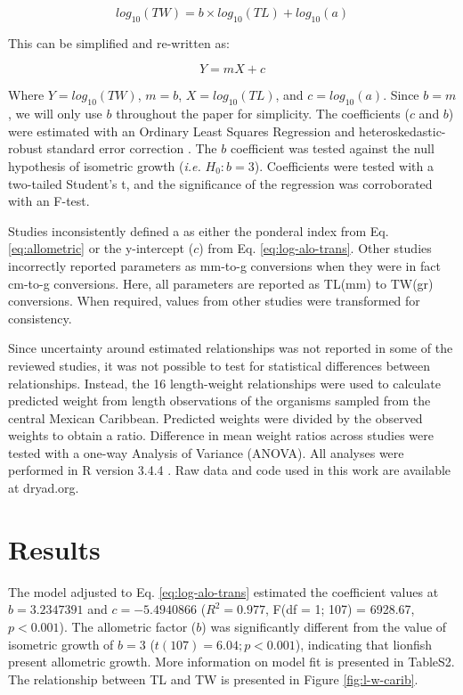 \documentclass[fleqn,10pt,lineno]{wlpeerj} %
\begin{document}
\begin{equation}
\label{eq:log-alo}
log_{10}(TW) = b\times log_{10}(TL) + log_{10}(a)
\end{equation}

This can be simplified and re-written as:

\begin{equation}
\label{eq:log-alo-trans}
Y = mX + c
\end{equation}

Where \(Y = log_{10}(TW)\), \(m = b\), \(X = log_{10}(TL)\), and
\(c = log_{10}(a)\). Since \(b = m\), we will only use \(b\) throughout
the paper for simplicity. The coefficients (\(c\) and \(b\)) were
estimated with an Ordinary Least Squares Regression and
heteroskedastic-robust standard error correction \citep{zeileis_2004}.
The \(b\) coefficient was tested against the null hypothesis of
isometric growth (\emph{i.e.} \(H_0: b = 3\)). Coefficients were tested
with a two-tailed Student's t, and the significance of the regression
was corroborated with an F-test.

Studies inconsistently defined a as either the ponderal index from Eq.
\ref{eq:allometric} or the y-intercept (\(c\)) from Eq.
\ref{eq:log-alo-trans}. Other studies incorrectly reported parameters as
mm-to-g conversions when they were in fact cm-to-g conversions. Here,
all parameters are reported as TL(mm) to TW(gr) conversions. When
required, values from other studies were transformed for consistency.

Since uncertainty around estimated relationships was not reported in
some of the reviewed studies, it was not possible to test for
statistical differences between relationships. Instead, the 16
length-weight relationships were used to calculate predicted weight from
length observations of the organisms sampled from the central Mexican
Caribbean. Predicted weights were divided by the observed weights to
obtain a ratio. Difference in mean weight ratios across studies were
tested with a one-way Analysis of Variance (ANOVA). All analyses were
performed in R version 3.4.4 \citep{rcore_2018}. Raw data and code used
in this work are available at dryad.org.

\section*{Results}

The model adjusted to Eq. \ref{eq:log-alo-trans} estimated the
coefficient values at \(b = 3.2347391\) and \(c = -5.4940866\)
(\(R^2 = 0.977\), F(df = 1; 107) = 6928.67, \(p < 0.001\)). The
allometric factor (\(b\)) was significantly different from the value of
isometric growth of \(b = 3\) (\(t(107) = 6.04; p<0.001\)), indicating
that lionfish present allometric growth. More information on model fit
is presented in TableS2. The relationship between TL and TW is presented
in Figure \ref{fig:l-w-carib}.
\end{document}

